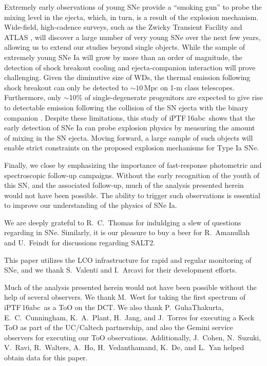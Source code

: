 \documentclass[twocolumn]{aastex61}
\newcommand{\abc}{iPTF\,16abc}
\begin{document}
Extremely early observations of young SNe provide a ``smoking
gun'' to probe the mixing level in the ejecta, which, in turn, is 
a result of the explosion mechanism. Wide-field, high-cadence surveys, such as the Zwicky Transient Facility \citep{2016PASP..128h4501B} and ATLAS \citep{2011PASP..123...58T,2013RSPTA.37120269T}, will discover a large number of very young SNe over the next few years, allowing us to extend our studies beyond single objects. While the sample of extremely young SNe Ia will grow by more than an order of magnitude, the detection of shock breakout cooling and ejecta-companion interaction will prove challenging. Given the diminutive size of WDs, the thermal emission following shock breakout can only be detected to $\sim 10\,\mathrm{Mpc}$ on 1-m class telescopes. Furthermore, only $\sim$10\% of single-degenerate progenitors are expected to give rise to detectable emission following the collision of the SN ejecta with the binary companion \citep{2010ApJ...708.1025K}. Despite these limitations, this study of \abc\ shows that the early detection of SNe Ia can probe explosion physics by measuring the amount of mixing in the SN ejecta. Moving forward, a large sample of such objects will enable strict constraints on the proposed explosion mechanisms for Type Ia SNe.

Finally, we close by emphasizing the importance of fast-response photometric and spectroscopic follow-up campaigns. Without the early recognition of the youth of this SN, and the associated follow-up, much of the analysis presented herein would not have been possible. The ability to trigger such observations is essential to improve our understanding of the physics of SNe Ia.

\acknowledgements

We are deeply grateful to R.~C.~Thomas for induldging a slew of questions regarding  in SNe. Similarly, it is our pleasure to buy a beer for R.~Amanullah and U.~Feindt for discussions regarding SALT2. 

This paper utilizes the LCO infrastructure for rapid and regular monitoring of SNe, and we thank S.~Valenti and I.~Arcavi for their development efforts.

Much of the analysis presented herein would not have been possible without the help of several observers. We thank M.~West for taking the first spectrum of \abc\ as a ToO on the DCT. We also thank P.~GuhaThakurta, E.~C.~Cunningham, K.~A.~Plant, H.~Jang, and J.~Torres for executing a Keck ToO as part of the UC/Caltech partnership, and also the Gemini service observers for executing our ToO observations. Additionally, J.~Cohen, N.~Suzuki, V.~Ravi, R.~Walters, A.~Ho, H.~Vedanthamand, K.~De, and L.~Yan helped obtain data for this paper.
\end{document}
